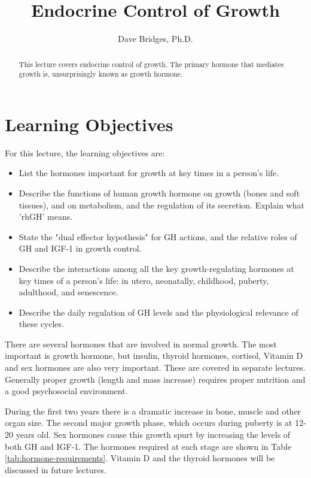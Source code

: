 \documentclass{tufte-handout}
\title{Endocrine Control of Growth}
\author{Dave Bridges, Ph.D.}
\begin{document}
\maketitle%

\begin{abstract}
\noindent This lecture covers endocrine control of growth.  The primary hormone that mediates growth is, unsurprisingly known as growth hormone.  
\end{abstract}

\tableofcontents

\pagebreak

\section{Learning Objectives}
For this lecture, the learning objectives are:
\begin{itemize}
\item List the hormones important for growth at key times in a person's life.
\item Describe the functions of human growth hormone on growth (bones and soft tissues), and on metabolism, and the regulation of its secretion.  Explain what 'rhGH' means.
\item State the "dual effector hypothesis" for GH actions, and the relative roles of GH and IGF-1 in growth control. 
\item Describe the interactions among all the key growth-regulating hormones at key times of a person's life: in utero, neonatally, childhood, puberty, adulthood, and senescence.
\item Describe the daily regulation of GH levels and the physiological relevance of these cycles.

\end{itemize}

\pagebreak

There are several hormones that are involved in normal growth.  The most important is growth hormone, but insulin, thyroid hormones, cortisol, Vitamin D and sex hormones are also very important.  These are covered in separate lectures.  Generally proper growth (length and mass increase) requires proper nutrition and a good psychosocial environment.   

  During the first two years there is a dramatic increase in bone, muscle and other organ size.  The second major growth phase, which occurs during puberty is at 12-20 years old.  Sex hormones cause this growth spurt by increasing the levels of both GH and IGF-1.  The hormones required at each stage are shown in Table \ref{tab:hormone-requirements}.  Vitamin D and the thyroid hormones will be discussed in future lectures.
\end{document}
